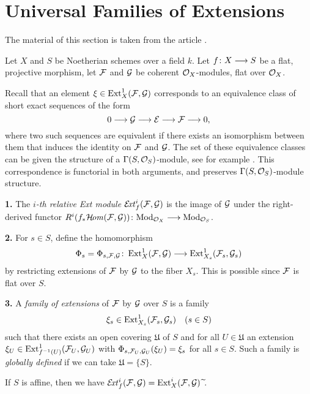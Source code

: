 \section{Universal Families of Extensions}

The material of this section is taken from the article \cite{lange-universal-extensions}.

Let $X$ and $S$ be Noetherian schemes over a field $k$. Let $f \colon X \longrightarrow S$ be a flat, projective morphism, let $\mathcal{F}$ and $\mathcal{G}$ be coherent $\mathcal{O}_X$-modules, flat over $\mathcal{O}_X$.

Recall that an element $\xi \in \operatorname{Ext}^1_{X}(\mathcal{F},\mathcal{G})$ corresponds to an equivalence class of short exact sequences of the form
\[
	0 \longrightarrow \mathcal{G} \longrightarrow \mathcal{E} \longrightarrow \mathcal{F} \longrightarrow 0,
\]
where two such sequences are equivalent if there exists an isomorphism between them that induces the identity on $\mathcal{F}$ and $\mathcal{G}$. The set of these equivalence classes can be given the structure of a $\Gamma(S,\mathcal{O}_S)$-module, see for example \cite[sec.\ 3.4]{weibel-homological-algebra}. This correspondence is functorial in both arguments, and preserves $\Gamma(S, \mathcal{O}_S)$-module structure.

\begin{definition}
	\textbf{1.} The \emph{$i$-th relative Ext module} $\mathcal{E}\!\mathit{xt}^i_f(\mathcal{F},\mathcal{G})$ is the image of $\mathcal{G}$ under the right-derived functor
	$R^i(f_{*}\mathcal{H}\!\mathit{om}(\mathcal{F},\mathcal{G}))
	\colon \mathrm{Mod}_{\mathcal{O}_X} \longrightarrow \mathrm{Mod}_{\mathcal{O}_S}$.

	\textbf{2.} For $s\in S$, define the homomorphism
	\[
		\Phi_s = \Phi_{s,\mathcal{F},\mathcal{G}}
		\colon \operatorname{Ext}^1_X(\mathcal{F},\mathcal{G})
		\longrightarrow \operatorname{Ext}^1_{X_s}(\mathcal{F}_s, \mathcal{G}_s)
	\]
	by restricting extensions of $\mathcal{F}$ by $\mathcal{G}$ to the fiber $X_s$. This is possible since $\mathcal{F}$ is flat over $S$.

	\textbf{3.} A \emph{family of extensions} of $\mathcal{F}$ by $\mathcal{G}$ over $S$ is a family
	\[
		\xi_s \in \operatorname{Ext}^1_{X_s}(\mathcal{F}_s,\mathcal{G}_s) \quad (s\in S)
	\]
	such that there exists an open covering $\mathfrak{U}$ of $S$ and for all $U\in \mathfrak{U}$ an extension $\xi_U \in \operatorname{Ext}^1_{f^{-1}(U)}(\mathcal{F}_U,\mathcal{G}_U)$
	with $\Phi_{s,\mathcal{F}_U,\mathcal{G}_U}(\xi_U) = \xi_s$ for all $s\in S$.
	Such a family is \emph{globally defined} if we can take $\mathfrak{U} = \{S\}$.
\end{definition}

\begin{remark}
	If $S$ is affine, then we have $\EXT^i_f(\mc{F},\mc{G})=\Ext^i_X(\mc{F},\mc{G}){\ \widetilde{}}$.
\end{remark}


